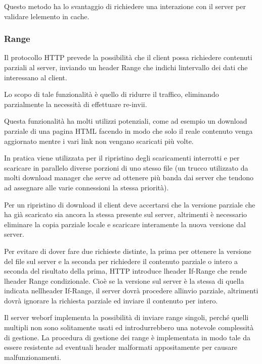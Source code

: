 \documentclass[a4paper,11pt]{article}
\begin{document}
{\sffamily
Questo metodo ha lo svantaggio di richiedere una interazione con il
server per validare l{\textquotesingle}elemento in cache.}


\bigskip

\subsubsection[Range]{Range}
{\sffamily
Il protocollo HTTP prevede la possibilit\`a che il client possa
richiedere contenuti parziali al server, inviando un header Range che
indichi l{\textquotesingle}intervallo dei dati che interessano al
client.}

{\sffamily
Lo scopo di tale funzionalit\`a \`e quello di ridurre il traffico,
eliminando parzialmente la necessit\`a di effettuare re-invii.}

{\sffamily
Questa funzionalit\`a ha molti utilizzi potenziali, come ad esempio un
download parziale di una pagina HTML facendo in modo che solo il reale
contenuto venga aggiornato mentre i vari link non vengano scaricati
pi\`u volte.}

{\sffamily
In pratica viene utilizzata per il ripristino degli scaricamenti
interrotti e per scaricare in parallelo diverse porzioni di uno stesso
file (un trucco utilizzato da molti download manager che serve ad
ottenere pi\`u banda dai server che tendono ad assegnare alle varie
connessioni la stessa priorit\`a).}

{\sffamily
Per un ripristino di download il client deve accertarsi che la versione
parziale che ha gi\`a scaricato sia ancora la stessa presente sul
server, altrimenti \`e necessario eliminare la copia parziale locale e
scaricare interamente la nuova versione dal server.}

{\sffamily
Per evitare di dover fare due richieste distinte, la prima per ottenere
la versione del file sul server e la seconda per richiedere il
contenuto parziale o intero a seconda del risultato della prima, HTTP
introduce l{\textquotesingle}header If-Range che rende
l{\textquotesingle}header Range condizionale. Cio\`e se la versione sul
server \`e la stessa di quella indicata nell{\textquotesingle}header
If-Range, il server dovr\`a procedere all{\textquotesingle}invio
parziale, altrimenti dovr\`a ignorare la richiesta parziale ed inviare
il contenuto per intero.}


\bigskip

{\sffamily
Il server weborf implementa la possibilit\`a di inviare range singoli,
perch\'e quelli multipli non sono solitamente usati ed introdurrebbero
una notevole complessit\`a di gestione. La procedura di gestione dei
range \`e implementata in modo tale da essere resistente ad eventuali
header malformati appositamente per causare malfunzionamenti.}
\end{document}

